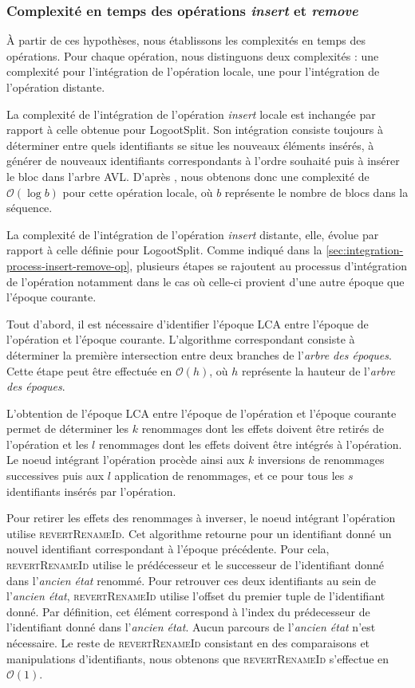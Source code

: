 \documentclass[12pt]{thesul}
\newcommand\bigO[1]{$\mathcal{O}(#1)$}
\begin{document}
\subsubsection{Complexité en temps des opérations \emph{insert} et \emph{remove}}

À partir de ces hypothèses, nous établissons les complexités en temps des opérations.
Pour chaque opération, nous distinguons deux complexités : une complexité pour l'intégration de l'opération locale, une pour l'intégration de l'opération distante.

La complexité de l'intégration de l'opération \emph{insert} locale est inchangée par rapport à celle obtenue pour LogootSplit.
Son intégration consiste toujours à déterminer entre quels identifiants se situe les nouveaux éléments insérés, à générer de nouveaux identifiants correspondants à l'ordre souhaité puis à insérer le bloc dans l'arbre AVL.
D'après \textcite{2013-logootsplit}, nous obtenons donc une complexité de \bigO{\log{}b} pour cette opération locale, où $b$ représente le nombre de blocs dans la séquence.

La complexité de l'intégration de l'opération \emph{insert} distante, elle, évolue par rapport à celle définie pour LogootSplit.
Comme indiqué dans la \autoref{sec:integration-process-insert-remove-op}, plusieurs étapes se rajoutent au processus d'intégration de l'opération notamment dans le cas où celle-ci provient d'une autre époque que l'époque courante.

Tout d'abord, il est nécessaire d'identifier l'époque \ac{LCA} entre l'époque de l'opération et l'époque courante.
L'algorithme correspondant consiste à déterminer la première intersection entre deux branches de l'\emph{arbre des époques}.
Cette étape peut être effectuée en \bigO{h}, où $h$ représente la hauteur de l'\emph{arbre des époques}.

L'obtention de l'époque \ac{LCA} entre l'époque de l'opération et l'époque courante permet de déterminer les $k$ renommages dont les effets doivent être retirés de l'opération et les $l$ renommages dont les effets doivent être intégrés à l'opération.
Le noeud intégrant l'opération procède ainsi aux $k$ inversions de renommages successives puis aux $l$ application de renommages, et ce pour tous les $s$ identifiants insérés par l'opération.

Pour retirer les effets des renommages à inverser, le noeud intégrant l'opération utilise \textsc{revertRenameId}.
Cet algorithme retourne pour un identifiant donné un nouvel identifiant correspondant à l'époque précédente.
Pour cela, \textsc{revertRenameId} utilise le prédécesseur et le successeur de l'identifiant donné dans l'\emph{ancien état} renommé.
Pour retrouver ces deux identifiants au sein de l'\emph{ancien état}, \textsc{revertRenameId} utilise l'offset du premier tuple de l'identifiant donné.
Par définition, cet élément correspond à l'index du prédecesseur de l'identifiant donné dans l'\emph{ancien état}.
Aucun parcours de l'\emph{ancien état} n'est nécessaire.
Le reste de \textsc{revertRenameId} consistant en des comparaisons et manipulations d'identifiants, nous obtenons que \textsc{revertRenameId} s'effectue en \bigO{1}.
\end{document}
